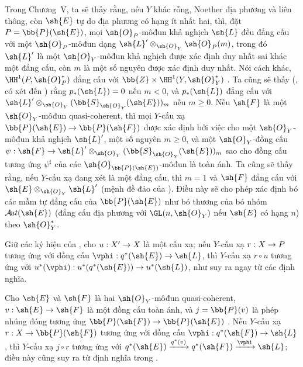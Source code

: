 \documentclass[oneside,10pt]{amsart}
\makeatletter
\renewcommand{\geq}{\geqslant}
\newcommand{\ega@arrow}[2]{\mathchoice{#1}{#2}{#2}{#2}}
\renewcommand{\to}{\ega@arrow{\longrightarrow}{\rightarrow}}
\def\shAut{\mathcal{A}\!\mathit{ut}}
\newcommand{\oldpage}[2][]{\marginnote{\normalfont\footnotesize\textbf{#1}~|~#2}\ignorespaces}
\let\EGAOriginalLabel\label
\renewcommand{\label}[1]{\phantomsection\EGAOriginalLabel{#1}}
\makeatother
\begin{document}
\begin{remark}[4.2.7]
\label{II.4.2.7}
Trong Chương~V, ta sẽ thấy rằng, nếu $Y$ khác rỗng, Noether địa phương và liên thông, còn $\sh{E}$ tự do địa phương có hạng ít nhất hai, thì, đặt $P=\bb{P}(\sh{E})$, mọi $\sh{O}_P$-môđun khả nghịch $\sh{L}$ đều đẳng cấu với một $\sh{O}_P$-môđun dạng $\sh{L}'\otimes_{\sh{O}_Y}\sh{O}_P(m)$, trong đó $\sh{L}'$ là một $\sh{O}_Y$-môđun khả nghịch được xác định duy nhất sai khác một đẳng cấu, còn $m$ là một số nguyên được xác định duy nhất.
Nói cách khác, $\HH^1(P,\sh{O}_P^*)$ đẳng cấu với $\bb{Z}\times\HH^1(Y,\sh{O}_Y^*)$ .
Ta cũng sẽ thấy (, có xét đến ) rằng $p_*(\sh{L})=0$ nếu $m<0$, và $p_*(\sh{L})$ đẳng cấu với $\sh{L}'\otimes_{\sh{O}_Y}(\bb{S}_{\sh{O}_Y}(\sh{E}))_m$ nếu $m\geq0$.
Nếu $\sh{F}$ là một $\sh{O}_Y$-môđun quasi-coherent, thì mọi $Y$-cấu xạ $\bb{P}(\sh{E})\to\bb{P}(\sh{F})$ được xác định bởi việc cho một $\sh{O}_Y$-môđun khả nghịch $\sh{L}'$, một số nguyên $m\geq0$, và một $\sh{O}_Y$-đồng cấu $\psi:\sh{F}\to\sh{L}'\otimes_{\sh{O}_Y}(\bb{S}_{\sh{O}_Y}(\sh{E}))_m$ sao cho đồng cấu tương ứng $\psi^\sharp$ của các $\sh{O}_{\bb{P}(\sh{E})}$-môđun là toàn ánh.
Ta cũng sẽ thấy rằng, nếu $Y$-cấu xạ đang xét là một đẳng cấu, thì $m=1$ và $\sh{F}$ đẳng cấu với $\sh{E}\otimes_{\sh{O}_Y}\sh{L}'$ (mệnh đề đảo của ).
Điều này sẽ cho phép xác định bó các mầm tự đẳng cấu của $\bb{P}(\sh{E})$ như bó thương của bó nhóm $\shAut(\sh{E})$ (đẳng cấu địa phương với $\GL(n,\sh{O}_Y)$ nếu $\sh{E}$ có hạng $n$) theo $\sh{O}_Y^*$.
\end{remark}

\begin{env}[4.2.8]
\label{II.4.2.8}
Giữ các ký hiệu của , cho $u:X'\to X$ là một cấu xạ;
nếu $Y$-cấu xạ $r:X\to P$ tương ứng với đồng cấu $\vphi:q^*(\sh{E})\to\sh{L}$, thì $Y$-cấu xạ $r\circ u$ tương ứng với $u^*(\vphi):u^*(q^*(\sh{E}))\to u^*(\sh{L})$, như suy ra ngay từ các định nghĩa.
\end{env}

\begin{env}[4.2.9]
\label{II.4.2.9}
Cho $\sh{E}$ và $\sh{F}$ là hai $\sh{O}_Y$-môđun quasi-coherent, $v:\sh{E}\to\sh{F}$ là một đồng cấu toàn ánh, và $j=\bb{P}(v)$ là phép nhúng đóng tương ứng $\bb{P}(\sh{F})\to\bb{P}(\sh{E})$ .
Nếu $Y$-cấu xạ $r:X\to\bb{P}(\sh{F})$ tương ứng với đồng cấu $\vphi:q^*(\sh{F})\to\sh{L}$, thì
\oldpage[II]{76}
$Y$-cấu xạ $j\circ r$ tương ứng với $q^*(\sh{E})\xrightarrow{q^*(v)}q^*(\sh{F})\xrightarrow{\vphi}\sh{L}$;
điều này cũng suy ra từ định nghĩa trong .
\end{env}
\end{document}
